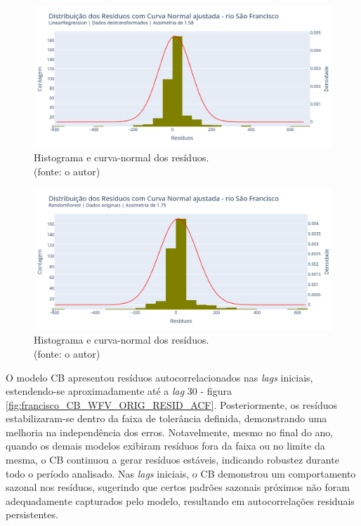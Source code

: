 \begin{figure}[!h]
\centering
\includegraphics[scale=0.33]{Figuras/rio_sao_francisco/wfv/LR/LR_WFV_LOG_RESID_x_CURVA_NORMAL.png}
\caption{Histograma e curva-normal dos resíduos.\\(fonte: o autor)}
\label{fig:francisco_LR_WFV_LOG_RESID_x_CURVA_NORMAL}
\end{figure}

\begin{figure}[!h]
\centering
\includegraphics[scale=0.33]{Figuras/rio_sao_francisco/wfv/RF/RF_WFV_ORIG_RESID_x_CURVA_NORMAL.png}
\caption{Histograma e curva-normal dos resíduos.\\(fonte: o autor)}
\label{fig:francisco_RF_WFV_ORIG_RESID_x_CURVA_NORMAL}
\end{figure}
\clearpage

O modelo CB apresentou resíduos autocorrelacionados nas \textit{lags} iniciais, estendendo-se aproximadamente até a \textit{lag} $30$ - figura \ref{fig:francisco_CB_WFV_ORIG_RESID_ACF}. Posteriormente, os resíduos estabilizaram-se dentro da faixa de tolerância definida, demonstrando uma melhoria na independência dos erros. Notavelmente, mesmo no final do ano, quando os demais modelos exibiram resíduos fora da faixa ou no limite da mesma, o CB continuou a gerar resíduos estáveis, indicando robustez durante todo o período analisado. Nas \textit{lags} iniciais, o CB demonstrou um comportamento sazonal nos resíduos, sugerindo que certos padrões sazonais próximos não foram adequadamente capturados pelo modelo, resultando em autocorrelações residuais persistentes.

